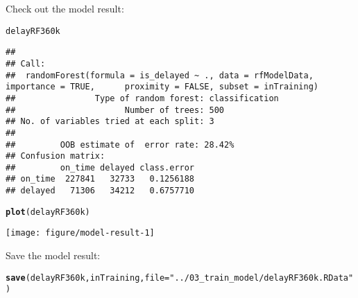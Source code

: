 \documentclass{article}\usepackage[]{graphicx}\usepackage[]{color}
\makeatletter
\def\maxwidth{ %
  \ifdim\Gin@nat@width>\linewidth
    \linewidth
  \else
    \Gin@nat@width
  \fi
}
\newcommand{\hlstr}[1]{\textcolor[rgb]{0.192,0.494,0.8}{#1}}%
\newcommand{\hlstd}[1]{\textcolor[rgb]{0.345,0.345,0.345}{#1}}%
\newcommand{\hlkwc}[1]{\textcolor[rgb]{0.333,0.667,0.333}{#1}}%
\newcommand{\hlkwd}[1]{\textcolor[rgb]{0.737,0.353,0.396}{\textbf{#1}}}%
\newenvironment{kframe}{%
 \def\at@end@of@kframe{}%
 \ifinner\ifhmode%
  \def\at@end@of@kframe{\end{minipage}}%
  \begin{minipage}{\columnwidth}%
 \fi\fi%
 \def\FrameCommand##1{\hskip\@totalleftmargin \hskip-\fboxsep
 \colorbox{shadecolor}{##1}\hskip-\fboxsep
     \hskip-\linewidth \hskip-\@totalleftmargin \hskip\columnwidth}%
 \MakeFramed {\advance\hsize-\width
   \@totalleftmargin\z@ \linewidth\hsize
   \@setminipage}}%
 {\par\unskip\endMakeFramed%
 \at@end@of@kframe}
\newenvironment{knitrout}{}{} %
\makeatother
\begin{document}




Check out the model result:
\begin{knitrout}
\color{fgcolor}\begin{kframe}
\begin{alltt}
\hlstd{delayRF360k}
\end{alltt}
\begin{verbatim}
## 
## Call:
##  randomForest(formula = is_delayed ~ ., data = rfModelData, importance = TRUE,      proximity = FALSE, subset = inTraining) 
##                Type of random forest: classification
##                      Number of trees: 500
## No. of variables tried at each split: 3
## 
##         OOB estimate of  error rate: 28.42%
## Confusion matrix:
##         on_time delayed class.error
## on_time  227841   32733   0.1256188
## delayed   71306   34212   0.6757710
\end{verbatim}
\begin{alltt}
\hlkwd{plot}\hlstd{(delayRF360k)}
\end{alltt}
\end{kframe}

{\centering \texttt{[image: figure/model-result-1]} 

}



\end{knitrout}

Save the model result:
\begin{knitrout}
\color{fgcolor}\begin{kframe}
\begin{alltt}
\hlkwd{save}\hlstd{(delayRF360k, inTraining,} \hlkwc{file}\hlstd{=}\hlstr{"../03_train_model/delayRF360k.RData"}\hlstd{)}
\end{alltt}
\end{kframe}
\end{knitrout}
\end{document}
